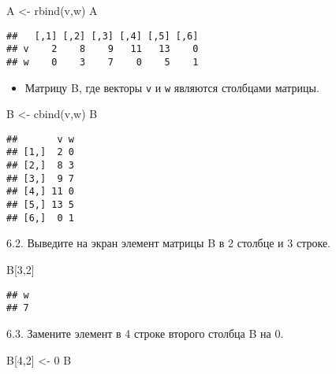 \documentclass[
]{article}
\newenvironment{Shaded}{\begin{snugshade}}{\end{snugshade}}
\newcommand{\DecValTok}[1]{\textcolor[rgb]{0.00,0.00,0.81}{#1}}
\newcommand{\FunctionTok}[1]{\textcolor[rgb]{0.00,0.00,0.00}{#1}}
\newcommand{\NormalTok}[1]{#1}
\newcommand{\OtherTok}[1]{\textcolor[rgb]{0.56,0.35,0.01}{#1}}
\providecommand{\tightlist}{%
  \setlength{\itemsep}{0pt}\setlength{\parskip}{0pt}}
\begin{document}
\begin{Shaded}
\begin{Highlighting}[]
\NormalTok{A }\OtherTok{\textless{}{-}} \FunctionTok{rbind}\NormalTok{(v,w)}
\NormalTok{A}
\end{Highlighting}
\end{Shaded}

\begin{verbatim}
##   [,1] [,2] [,3] [,4] [,5] [,6]
## v    2    8    9   11   13    0
## w    0    3    7    0    5    1
\end{verbatim}

\begin{itemize}
\tightlist
\item
  Матрицу B, где векторы \texttt{v} и \texttt{w} являются столбцами
  матрицы.
\end{itemize}

\begin{Shaded}
\begin{Highlighting}[]
\NormalTok{B }\OtherTok{\textless{}{-}} \FunctionTok{cbind}\NormalTok{(v,w)}
\NormalTok{B}
\end{Highlighting}
\end{Shaded}

\begin{verbatim}
##       v w
## [1,]  2 0
## [2,]  8 3
## [3,]  9 7
## [4,] 11 0
## [5,] 13 5
## [6,]  0 1
\end{verbatim}

6.2. Выведите на экран элемент матрицы B в 2 столбце и 3 строке.

\begin{Shaded}
\begin{Highlighting}[]
\NormalTok{B[}\DecValTok{3}\NormalTok{,}\DecValTok{2}\NormalTok{]}
\end{Highlighting}
\end{Shaded}

\begin{verbatim}
## w 
## 7
\end{verbatim}

6.3. Замените элемент в 4 строке второго столбца B на 0.

\begin{Shaded}
\begin{Highlighting}[]
\NormalTok{B[}\DecValTok{4}\NormalTok{,}\DecValTok{2}\NormalTok{] }\OtherTok{\textless{}{-}} \DecValTok{0}
\NormalTok{B}
\end{Highlighting}
\end{Shaded}
\end{document}
